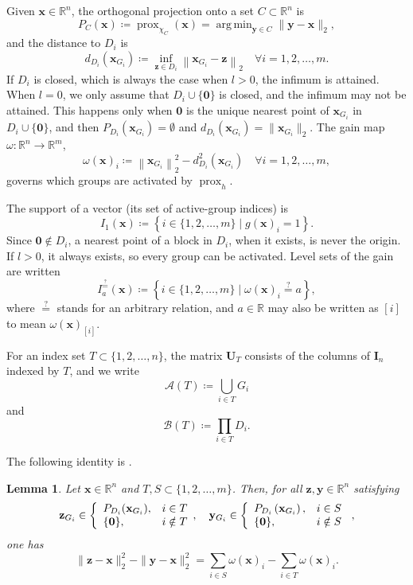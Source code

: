 \documentclass[11pt,a4paper]{article}
\theoremstyle{plain}
\newtheorem{lemma}{Lemma}
\theoremstyle{definition}
\theoremstyle{remark}
\newcommand*{\vz}{\mathbf{0}}
\newcommand*\R{\mathbb{R}}
\newcommand*\x{\mathbf{x}}
\newcommand*\y{\mathbf{y}}
\newcommand*\z{\mathbf{z}}
\newcommand*\prox{\operatorname{prox}}
\DeclareMathOperator*{\argmin}{arg\,min}
\begin{document}
Given \(\x \in \R^n\), the orthogonal projection onto a set \(C\subset\R^n\) is $$ P_C(\x)\coloneqq \prox_{\chi_C}(\x)=\argmin_{\y\in C}\|\y-\x\|_2, $$ and the distance to \(D_i\) is $$ d_{D_i}\left(\x_{G_i}\right)\coloneqq\inf _{\z \in D_i}\left\|\x_{G_i}-\z\right\|_2\quad \forall i=1,2, \ldots, m .
$$
If \(D_i\) is closed, which is always the case when \(l>0\), the infimum is
attained.
When \(l=0\), we only assume that \(D_i\cup\{\vz\}\) is closed, and the infimum may not be attained.
This happens only when \(\vz\) is the unique nearest point of \(\x_{G_i}\) in \(D_i\cup\{\vz\}\), and then \(P_{D_i}(\x_{G_i})=\emptyset\) and \(d_{D_i}(\x_{G_i})=\|\x_{G_i}\|_2\).
The gain map
\(\omega: \R^n \to \R^m\),
\begin{equation}
  \label{omega}
  \omega(\x)_i\coloneqq\left\|\x_{G_i}\right\|_2^2-d_{D_i}^2\left(\x_{G_i}\right)\quad \forall i=1,2, \ldots, m,
\end{equation}
governs which groups are activated by \(\prox_h\).

The support of a vector (its set of active-group indices) is $$I_1(\x)\coloneqq\left\{i \in\{1,2, \ldots, m\}\mid g(\x)_i=1\right\}.
$$
Since \(\vz\notin D_i\), a nearest point of a block in \(D_i\), when it
exists, is never the origin.
If \(l>0\), it always exists, so every group can be activated.
Level sets of the gain are written $$I_{a}^{\stackrel{?
      }{=}}(\x)\coloneqq\left\{i\in\{1,2,\ldots,m\}\mid \omega(\x)_i\stackrel{?}{=}a\right\},$$
where \(\stackrel{?}{=}\) stands for an arbitrary relation, and \(a\in\R\) may
also be written as \([i]\) to mean \(\omega(\x)_{[i]}\).

For an index set \(T\subset\{1,2,\ldots,n\}\), the matrix \(\mathbf{U}_T\) consists of the columns of \(\mathbf{I}_n\) indexed by \(T\), and we write $$ \mathcal{A}(T)\coloneqq\bigcup_{i\in T} G_i $$ and $$ \mathcal{B}(T)\coloneqq \prod_{i\in T}D_i.
$$

The following identity is \cite[Lemma~3.1]{beck2018}.

\begin{lemma}\label{lem:toomega}
  Let \(\x \in \R^n\) and \(T, S \subset\{1,2, \ldots, m\}\).
  Then, for all
  \(\z, \y \in \R^n\) satisfying
  $$
    \z_{G_i} \in\left\{\begin{array} { l l }
      { P_{ D_{ i } } ( \x_{ G_{ i } } ) , } & { i \in T  }    \\
      { \{ \mathbf { 0 } \} , }              & { i \notin T  }
    \end{array}, \quad \y _ { G _ { i } } \in \left\{\begin{array}{ll}
      P_{D_i}\left(\x_{G_i}\right), & i \in S    \\
      \{\vz\},                      & i \notin S
    \end{array}\right.\right.,
  $$
  one has
  $$
    \|\z-\x\|_2^2-\|\y-\x\|_2^2=\sum_{i \in S} \omega(\x)_i-\sum_{i \in T} \omega(\x)_i .
  $$
\end{lemma}
\end{document}
